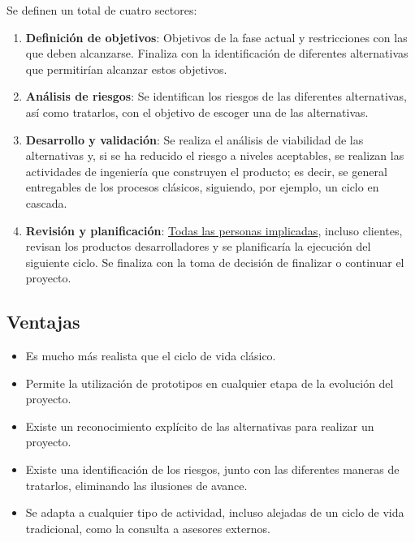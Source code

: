 Se definen un total de cuatro sectores:

\begin{enumerate}
   \item \textbf{Definición de objetivos}: Objetivos de la fase actual y restricciones con las que deben alcanzarse. Finaliza con la identificación de diferentes alternativas que permitirían alcanzar estos objetivos.
   \item \textbf{Análisis de riesgos}: Se identifican los riesgos de las diferentes alternativas, así como tratarlos, con el objetivo de escoger una de las alternativas.
   \item \textbf{Desarrollo y validación}: Se realiza el análisis de viabilidad de las alternativas y, si se ha reducido el riesgo a niveles aceptables, se realizan las actividades de ingeniería que construyen el producto; es decir, se general entregables de los procesos clásicos, siguiendo, por ejemplo, un ciclo en cascada.
   \item \textbf{Revisión y planificación}: \uline{Todas las personas implicadas}, incluso clientes, revisan los productos desarrolladores y se planificaría la ejecución del siguiente ciclo. Se finaliza con la toma de decisión de finalizar o continuar el proyecto.
\end{enumerate}


\subsection{Ventajas}

\begin{itemize}
   \item Es mucho más realista que el ciclo de vida clásico.
   \item Permite la utilización de prototipos en cualquier etapa de la evolución del proyecto.
   \item Existe un reconocimiento explícito de las alternativas para realizar un proyecto.
   \item Existe una identificación de los riesgos, junto con las diferentes maneras de tratarlos, eliminando las ilusiones de avance.
   \item Se adapta a cualquier tipo de actividad, incluso alejadas de un ciclo de vida tradicional, como la consulta a asesores externos.
\end{itemize}


